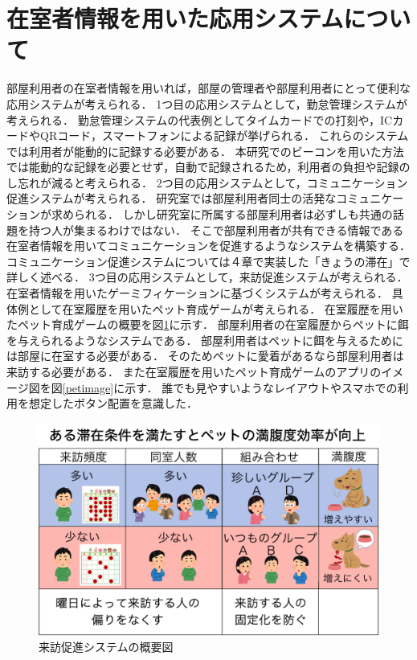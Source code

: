 
\section{在室者情報を用いた応用システムについて}\label{3.4}
部屋利用者の在室者情報を用いれば，部屋の管理者や部屋利用者にとって便利な応用システムが考えられる．
1つ目の応用システムとして，勤怠管理システムが考えられる．
勤怠管理システムの代表例としてタイムカードでの打刻や，ICカードやQRコード，スマートフォンによる記録が挙げられる．
これらのシステムでは利用者が能動的に記録する必要がある．
本研究でのビーコンを用いた方法では能動的な記録を必要とせず，自動で記録されるため，利用者の負担や記録のし忘れが減ると考えられる．
2つ目の応用システムとして，コミュニケーション促進システムが考えられる．
研究室では部屋利用者同士の活発なコミュニケーションが求められる．
しかし研究室に所属する部屋利用者は必ずしも共通の話題を持つ人が集まるわけではない．
そこで部屋利用者が共有できる情報である在室者情報を用いてコミュニケーションを促進するようなシステムを構築する．
コミュニケーション促進システムについては４章で実装した「きょうの滞在」で詳しく述べる．
3つ目の応用システムとして，来訪促進システムが考えられる．
在室者情報を用いたゲーミフィケーションに基づくシステムが考えられる．
具体例として在室履歴を用いたペット育成ゲームが考えられる．
在室履歴を用いたペット育成ゲームの概要を図\ref{petgaiyou}に示す．
部屋利用者の在室履歴からペットに餌を与えられるようなシステムである．
部屋利用者はペットに餌を与えるためには部屋に在室する必要がある．
そのためペットに愛着があるなら部屋利用者は来訪する必要がある．
また在室履歴を用いたペット育成ゲームのアプリのイメージ図を図\ref{petimage}に示す．
誰でも見やすいようなレイアウトやスマホでの利用を想定したボタン配置を意識した．
\begin{figure}[H]
  \begin{center}
    \includegraphics[width=160mm]{image/petgaiyou.pdf}
    \caption{来訪促進システムの概要図}
    \label{petgaiyou}
  \end{center}
\end{figure}

